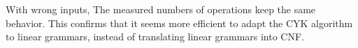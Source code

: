 \documentclass[12pt]{extarticle}
\begin{document}
\begin{multicols}{2}
With wrong inputs, The measured numbers of operations keep the same
behavior. This confirms that it seems more efficient to adapt the CYK algorithm
to linear grammars, instead of translating linear grammars into CNF.

\end{multicols}
\end{document}

